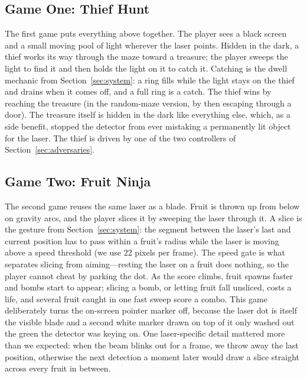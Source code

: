 \documentclass[conference]{IEEEtran}
\begin{document}
\subsection{Game One: Thief Hunt}
The first game puts everything above together. The player sees a black screen and
a small moving pool of light wherever the laser points. Hidden in the dark, a
thief works its way through the maze toward a treasure; the player sweeps the
light to find it and then holds the light on it to catch it. Catching is the dwell
mechanic from Section~\ref{sec:system}: a ring fills while the light stays on the
thief and drains when it comes off, and a full ring is a catch. The thief wins by
reaching the treasure (in the random-maze version, by then escaping through a
door). The treasure itself is hidden in the dark like everything else, which, as a
side benefit, stopped the detector from ever mistaking a permanently lit object
for the laser. The thief is driven by one of the two controllers of
Section~\ref{sec:adversaries}.

\subsection{Game Two: Fruit Ninja}
The second game reuses the same laser as a blade. Fruit is thrown up from below
on gravity arcs, and the player slices it by sweeping the laser through it. A
slice is the gesture from Section~\ref{sec:system}: the segment between the
laser's last and current position has to pass within a fruit's radius while the
laser is moving above a speed threshold (we use 22 pixels per frame). The speed
gate is what separates slicing from aiming---resting the laser on a fruit does
nothing, so the player cannot cheat by parking the dot. As the score climbs, fruit
spawns faster and bombs start to appear; slicing a bomb, or letting fruit fall
unsliced, costs a life, and several fruit caught in one fast sweep score a combo.
This game deliberately turns the on-screen pointer marker off, because the laser
dot is itself the visible blade and a second white marker drawn on top of it only
washed out the green the detector was keying on. One laser-specific detail mattered
more than we expected: when the beam blinks out for a frame, we throw away the last
position, otherwise the next detection a moment later would draw a slice straight
across every fruit in between.
\end{document}
